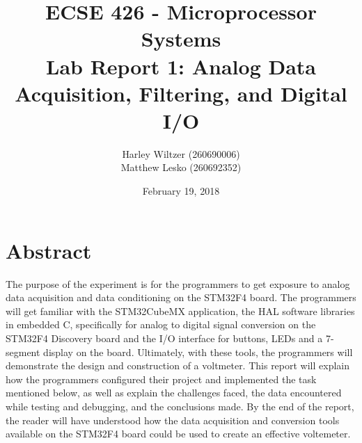 \documentclass[12pt]{report}
\title{ECSE 426 - Microprocessor Systems\\Lab Report 1: Analog Data Acquisition, Filtering, and
Digital I/O}
\author{Harley Wiltzer (260690006)\\Matthew Lesko (260692352)}
\date{February 19, 2018}
\begin{document}
\maketitle
{}
\tableofcontents
\listoffigures
\let\clearpage\relax
\listoftables
\newpage
{}
\section{Abstract}
The purpose of the experiment is for the programmers to get exposure to analog data acquisition and
data conditioning on the STM32F4 board. The programmers will get familiar with the STM32CubeMX application, the HAL
software libraries in embedded C, specifically for analog to digital signal conversion on the
STM32F4 Discovery board and the I/O interface for buttons, LEDs and a 7-segment display on the
board. Ultimately, with these tools, the programmers will demonstrate the design and construction of
a voltmeter. This report will explain how the programmers configured their project and implemented the
task mentioned below, as well as explain the challenges faced, the data
encountered while testing and debugging, and the conclusions made. By the end of the report, the reader will have understood how the data acquisition and conversion tools available on the STM32F4 board could be used to create an effective voltemeter.
\end{document}
